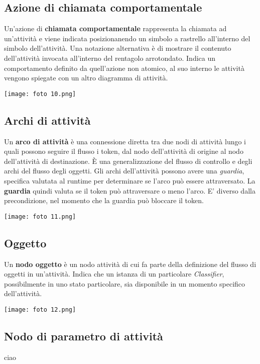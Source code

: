 \documentclass{article}
\begin{document}
\subsection*{Azione di chiamata comportamentale}
\large

Un'azione di \textbf{chiamata comportamentale} rappresenta la chiamata ad un'attività e viene indicata posizionanendo un simbolo a rastrello all'interno del simbolo dell'attività. Una notazione alternativa è di mostrare il contenuto dell'attività invocata all'interno del rentagolo arrotondato. Indica un comportamento definito da quell'azione non atomico, al suo interno le attività vengono spiegate con un altro diagramma di attività.
\begin{center}
    \texttt{[image: foto 10.png]}
\end{center}

\subsection*{Archi di attività}
\large

Un \textbf{arco di attività} è una connessione diretta tra due nodi di attività lungo i quali possono seguire il flusso i token, dal nodo dell'attività di origine al nodo dell'attività di destinazione. È una generalizzazione del flusso di controllo e degli archi del flusso degli oggetti.
Gli archi dell'attività possono avere una \textit{guardia}, specifica valutata al runtime per determinare se l'arco può essere attraversato. La \textbf{guardia} quindi valuta se il token può attraversare o meno l'arco. E' diverso dalla precondizione, nel momento che la guardia può bloccare il token.
\begin{center}
    \texttt{[image: foto 11.png]}
\end{center}

\subsection*{Oggetto}
\large

Un \textbf{nodo oggetto} è un nodo attività di cui fa parte della definizione del flusso di oggetti in un'attività. Indica che un istanza di un particolare \textit{Classifier}, possibilmente in uno stato particolare, sia disponibile in un momento specifico dell'attività.
\begin{center}
    \texttt{[image: foto 12.png]}
\end{center}

\subsection*{Nodo di parametro di attività}
\large

ciao
\end{document}
